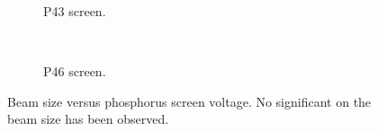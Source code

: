 \begin{figure}[!ht]
	\begin{subfigure}[t]{0.5\textwidth}
		
		\caption{P43 screen.}
		\label{}
	\end{subfigure}
	~
	\begin{subfigure}[t]{0.5\textwidth}
		
		\caption{P46 screen.}
		\label{}
	\end{subfigure}
	\caption[Beam size versus phosphorus screen voltage.]{Beam size versus phosphorus screen voltage. No significant on the beam size has been observed.}
	\label{chap4:P_size}
\end{figure}